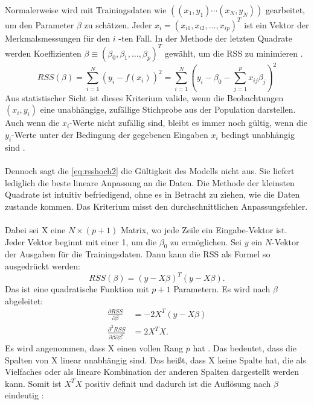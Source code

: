 Normalerweise wird mit Trainingsdaten wie \( ( (x_1, y_1) \cdots (x_N, y_N) ) \) gearbeitet, um den Parameter $\beta$ zu schätzen. Jeder \( x_i = (x_{i1}, x_{i2}, \ldots, x_{ip})^T \) ist ein Vektor der Merkmalsmessungen für den \(i\) -ten Fall. In der Methode der letzten Quadrate werden Koeffizienten \( \beta \equiv (\beta_0, \beta_1, \ldots, \beta_p)^T \) gewählt, um die \ac{RSS} zu minimieren \cite{hastie2009elements}. 
\begin{equation}
RSS(\beta) = \sum_{i=1}^{N} (y_i - f(x_i))^2 
= \sum_{i=1}^{N} \left( y_i - \beta_0 - \sum_{j=1}^{p} x_{ij} \beta_j \right)^2
\label{eq:rsshoch2}
\end{equation}
Aus statistischer Sicht ist dieses Kriterium valide, wenn die Beobachtungen \( (x_i, y_i) \) eine unabhängige, zufällige Stichprobe aus der Population darstellen. Auch wenn die \(x_i\)-Werte nicht zufällig sind, bleibt es immer noch gültig, wenn die \(y_i\)-Werte unter der Bedingung der gegebenen Eingaben \(x_i\) bedingt unabhängig sind \cite{hastie2009elements}.  \\\\
Dennoch sagt die \autoref{eq:rsshoch2} die Gültigkeit des Modells nicht aus. Sie liefert lediglich die beste lineare Anpassung an die Daten. Die Methode der kleinsten Quadrate ist intuitiv befriedigend, ohne es in Betracht zu ziehen, wie die Daten zustande kommen. Das Kriterium misst den durchschnittlichen Anpassungsfehler. \\\\
Dabei sei X eine \( N \times (p + 1) \) Matrix, wo jede Zeile ein Eingabe-Vektor ist. Jeder Vektor beginnt mit einer 1, um die $\beta_0$ zu ermöglichen. Sei \(y\) ein \(N\)-Vektor der Ausgaben für die Trainingsdaten. Dann kann die \ac{RSS} als Formel so ausgedrückt werden: 
\begin{equation}
RSS(\beta) = (y - X\beta)^T (y - X\beta).
\label{eq:RSSmatrix}
\end{equation}
Das ist eine quadratische Funktion mit \(p + 1\) Parametern. Es wird nach $\beta$ abgeleitet:
\begin{equation}
\begin{aligned}
\frac{\partial RSS}{\partial \beta} &= -2 X^T (y - X\beta) \\
\frac{\partial^2 RSS}{\partial \beta \partial \beta^T} &= 2 X^T X.
\end{aligned}
\label{eq:RSSableitung}
\end{equation}
Es wird angenommen, dass X einen vollen Rang \(p\) hat \cite{huber1981robust}. Das bedeutet, dass die Spalten von X linear unabhängig sind. Das heißt, dass X keine Spalte hat, die als Vielfaches oder als lineare Kombination der anderen Spalten dargestellt werden kann.  Somit ist \( X^T X \) positiv definit und dadurch ist die Auflösung nach $\beta$ eindeutig \cite{hastie2009elements}: 
